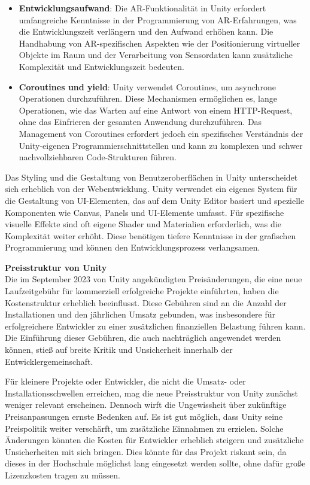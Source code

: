 \begin{itemize}
    \item \textbf{Entwicklungsaufwand}: Die AR-Funktionalität in Unity erfordert umfangreiche Kenntnisse in der Programmierung von AR-Erfahrungen, was die Entwicklungszeit verlängern und den Aufwand erhöhen kann. Die Handhabung von AR-spezifischen Aspekten wie der Positionierung virtueller Objekte im Raum und der Verarbeitung von Sensordaten kann zusätzliche Komplexität und Entwicklungszeit bedeuten.
    \item \textbf{Coroutines und yield}: Unity verwendet Coroutines, um asynchrone Operationen durchzuführen. Diese Mechanismen ermöglichen es, lange Operationen, wie das Warten auf eine Antwort von einem HTTP-Request, ohne das Einfrieren der gesamten Anwendung durchzuführen. Das Management von Coroutines erfordert jedoch ein spezifisches Verständnis der Unity-eigenen Programmierschnittstellen und kann zu komplexen und schwer nachvollziehbaren Code-Strukturen führen.
\end{itemize}

Das Styling und die Gestaltung von Benutzeroberflächen in Unity unterscheidet sich erheblich von der Webentwicklung. Unity verwendet ein eigenes System für die Gestaltung von UI-Elementen, das auf dem Unity Editor basiert und spezielle Komponenten wie Canvas, Panels und UI-Elemente umfasst. Für spezifische visuelle Effekte sind oft eigene Shader und Materialien erforderlich, was die Komplexität weiter erhöht. Diese benötigen tiefere Kenntnisse in der grafischen Programmierung und können den Entwicklungsprozess verlangsamen.

\textbf{Preisstruktur von Unity}\\ 
Die im September 2023 von Unity angekündigten Preisänderungen, die eine neue Laufzeitgebühr für kommerziell erfolgreiche Projekte einführten, haben die Kostenstruktur erheblich beeinflusst. Diese Gebühren sind an die Anzahl der Installationen und den jährlichen Umsatz gebunden, was insbesondere für erfolgreichere Entwickler zu einer zusätzlichen finanziellen Belastung führen kann. Die Einführung dieser Gebühren, die auch nachträglich angewendet werden können, stieß auf breite Kritik und Unsicherheit innerhalb der Entwicklergemeinschaft.

Für kleinere Projekte oder Entwickler, die nicht die Umsatz- oder Installationsschwellen erreichen, mag die neue Preisstruktur von Unity zunächst weniger relevant erscheinen. Dennoch wirft die Ungewissheit über zukünftige Preisanpassungen ernste Bedenken auf. Es ist gut möglich, dass Unity seine Preispolitik weiter verschärft, um zusätzliche Einnahmen zu erzielen. Solche Änderungen könnten die Kosten für Entwickler erheblich steigern und zusätzliche Unsicherheiten mit sich bringen. Dies könnte für das Projekt riskant sein, da dieses in der Hochschule möglichst lang eingesetzt werden sollte, ohne dafür große Lizenzkosten tragen zu müssen.

